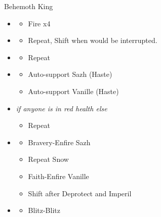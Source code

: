 \begin{paracol}{2}
\begin{battle}{Behemoth King}
\begin{itemize}
		\item \sixth
		      \begin{itemize}
			      \item Fire x4
		      \end{itemize}
		\item \fifth
		      \begin{itemize}
			      \item Repeat, Shift when would be interrupted.
		      \end{itemize}
		\item \sixth
		      \begin{itemize}
			      \item Repeat
		      \end{itemize}
		\item \fourth
		      \begin{itemize}
			      \item Auto-support Sazh (Haste)
			      \item Auto-support Vanille (Haste)
		      \end{itemize}
		\item \fifth \textit{if anyone is in red health else} \sixth
		      \begin{itemize}
			      \item Repeat
		      \end{itemize}
		\item \third
		      \begin{itemize}
			      \item Bravery-Enfire Sazh
			      \item Repeat Snow
			      \item Faith-Enfire Vanille
			      \item Shift after Deprotect and Imperil
		      \end{itemize}
		\item \second
		      \begin{itemize}
			      \item Blitz-Blitz
		      \end{itemize}
	\end{itemize}
\end{battle}
\switchcolumn*


\end{paracol}
